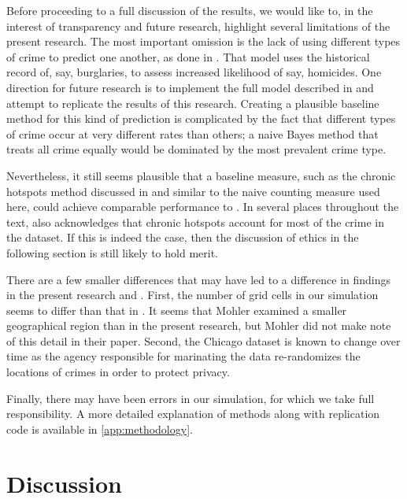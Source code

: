 Before proceeding to a full discussion of the results, we would like to, in the interest of transparency and future research, highlight several limitations of the present research. The most important omission is the lack of using different types of crime to predict one another, as done in \citet{mohler_marked_2014}. That model uses the historical record of, say, burglaries, to assess increased likelihood of say, homicides. One direction for future research is to implement the full model described in \citet{mohler_marked_2014} and attempt to replicate the results of this research. Creating a plausible baseline method for this kind of prediction is complicated by the fact that different types of crime occur at very different rates than others; a naive Bayes method that treats all crime equally would be dominated by the most prevalent crime type.

Nevertheless, it still seems plausible that a baseline measure, such as the chronic hotspots method discussed in \citet{mohler_marked_2014} and similar to the naive counting measure used here, could achieve comparable performance to \pp. In several places throughout the text, \citet{mohler_marked_2014} also acknowledges that chronic hotspots account for most of the crime in the dataset. If this is indeed the case, then the discussion of ethics in the following section is still likely to hold merit. 


There are a few smaller differences that may have led to a difference in findings in the present research and \citet{mohler_marked_2014}. First, the number of grid cells in our simulation seems to differ than that in \citet{mohler_marked_2014}. It seems that Mohler examined a smaller geographical region than in the present research, but Mohler did not make note of this detail in their paper. Second, the Chicago dataset is known to change over time as the agency responsible for marinating the data re-randomizes the locations of crimes in order to protect privacy.

Finally, there may have been errors in our simulation, for which we take full responsibility. A more detailed explanation of methods along with replication code is available in \autoref{app:methodology}.

\section{Discussion} \label{sec:discussion}


